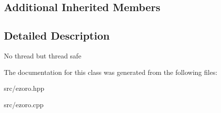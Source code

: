 \subsection*{Additional Inherited Members}


\subsection{Detailed Description}
No thread but thread safe 

The documentation for this class was generated from the following files\-:\begin{DoxyCompactItemize}
\item 
src/ezoro.\-hpp\item 
src/ezoro.\-cpp\end{DoxyCompactItemize}
